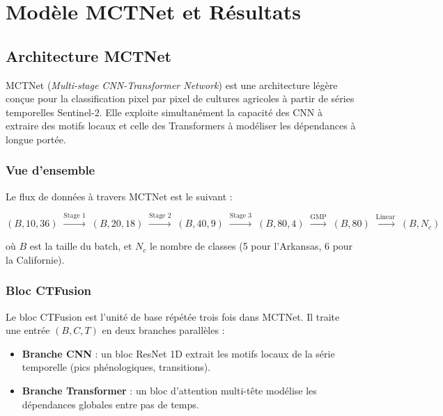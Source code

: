 
\chapter{Modèle MCTNet et Résultats}
\label{chap:modele}

\section{Architecture MCTNet}
\label{sec:architecture}

MCTNet (\textit{Multi-stage CNN-Transformer Network}) \cite{wang2024} est une
architecture légère conçue pour la classification pixel par pixel de cultures
agricoles à partir de séries temporelles Sentinel-2. Elle exploite
simultanément la capacité des CNN à extraire des motifs locaux et celle des
Transformers à modéliser les dépendances à longue portée.

\subsection{Vue d'ensemble}

Le flux de données à travers MCTNet est le suivant :

\begin{equation}
  (B, 10, 36) \;\xrightarrow{\text{Stage 1}}\; (B, 20, 18)
  \;\xrightarrow{\text{Stage 2}}\; (B, 40, 9)
  \;\xrightarrow{\text{Stage 3}}\; (B, 80, 4)
  \;\xrightarrow{\text{GMP}}\; (B, 80)
  \;\xrightarrow{\text{Linear}}\; (B, N_c)
\end{equation}

où $B$ est la taille du batch, et $N_c$ le nombre de classes (5 pour
l'Arkansas, 6 pour la Californie).

\subsection{Bloc CTFusion}
\label{sec:ctfusion}

Le bloc CTFusion est l'unité de base répétée trois fois dans MCTNet. Il
traite une entrée $(B, C, T)$ en deux branches parallèles :

\begin{itemize}
  \item \textbf{Branche CNN} : un bloc ResNet 1D extrait les motifs locaux
        de la série temporelle (pics phénologiques, transitions).
  \item \textbf{Branche Transformer} : un bloc d'attention multi-tête
        modélise les dépendances globales entre pas de temps.
\end{itemize}

